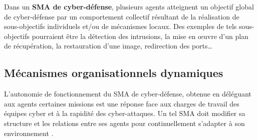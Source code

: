 \documentclass[conference]{IEEEtran}
\begin{document}
Dans un \textbf{SMA de cyber-défense}, plusieurs agents atteignent un objectif global de cyber-défense par un comportement collectif résultant de la réalisation de sous-objectifs individuels et/ou de mécanismes locaux\cite{jamont2015meeting}. Des exemples de tels sous-objectifs pourraient être la détection des intrusions, la mise en œuvre d'un plan de récupération, la restauration d'une image, redirection des ports\dots



\subsection{Mécanismes organisationnels dynamiques}

L'autonomie de fonctionnement du SMA de cyber-défense, obtenue  en déléguant aux agents certaines missions %
est une réponse face aux charges de travail des équipes cyber et à la rapidité des cyber-attaques\cite{ieeesp_KottT20}.
Un tel SMA doit modifier sa structure et les relations entre ses agents pour continuellement s'adapter à son environnement \cite{theron_autonomous_2021}.

\end{document}
